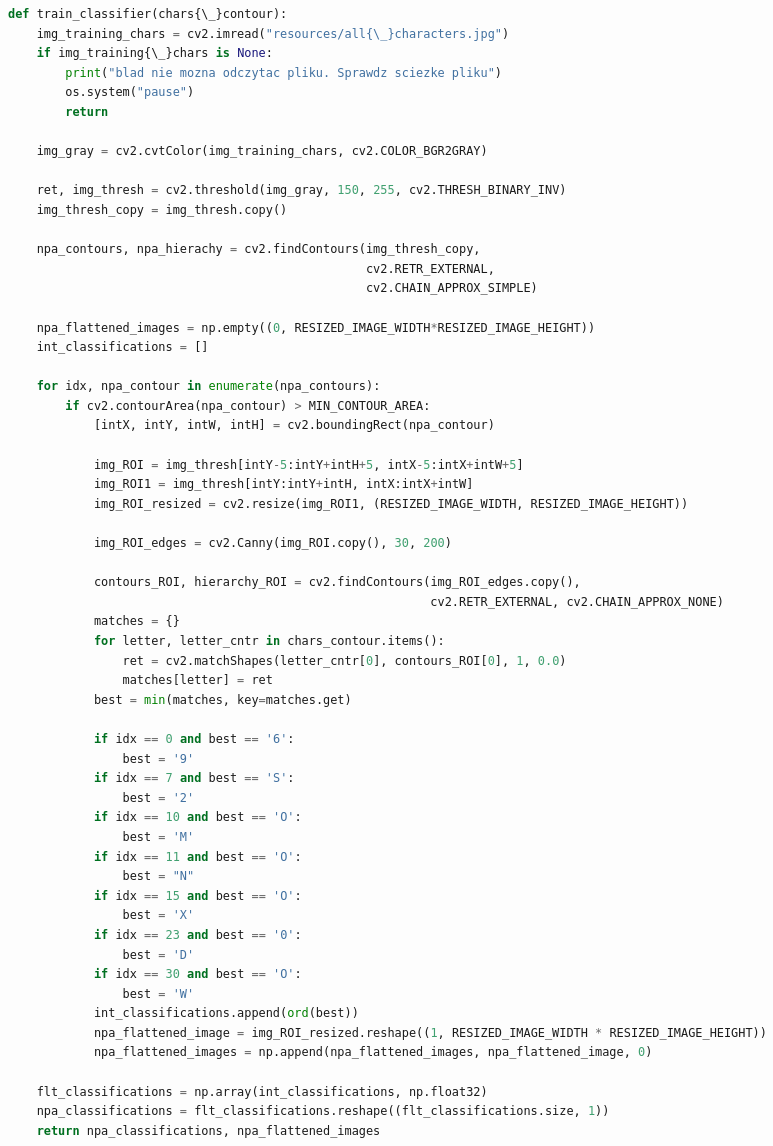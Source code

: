 \documentclass[12pt,a4paper,oneside]{article}
\theoremstyle{definition}
\numberwithin{equation}{section}
\begin{document}
\begin{adjustbox}{max width=\textwidth}
\begin{lstlisting}[language=Python]
def train_classifier(chars{\_}contour):
    img_training_chars = cv2.imread("resources/all{\_}characters.jpg")
    if img_training{\_}chars is None:
        print("blad nie mozna odczytac pliku. Sprawdz sciezke pliku")
        os.system("pause")
        return

    img_gray = cv2.cvtColor(img_training_chars, cv2.COLOR_BGR2GRAY)

    ret, img_thresh = cv2.threshold(img_gray, 150, 255, cv2.THRESH_BINARY_INV)
    img_thresh_copy = img_thresh.copy()

    npa_contours, npa_hierachy = cv2.findContours(img_thresh_copy,
                                                  cv2.RETR_EXTERNAL,
                                                  cv2.CHAIN_APPROX_SIMPLE)

    npa_flattened_images = np.empty((0, RESIZED_IMAGE_WIDTH*RESIZED_IMAGE_HEIGHT))
    int_classifications = []

    for idx, npa_contour in enumerate(npa_contours):
        if cv2.contourArea(npa_contour) > MIN_CONTOUR_AREA:
            [intX, intY, intW, intH] = cv2.boundingRect(npa_contour)

            img_ROI = img_thresh[intY-5:intY+intH+5, intX-5:intX+intW+5]
            img_ROI1 = img_thresh[intY:intY+intH, intX:intX+intW]
            img_ROI_resized = cv2.resize(img_ROI1, (RESIZED_IMAGE_WIDTH, RESIZED_IMAGE_HEIGHT))

            img_ROI_edges = cv2.Canny(img_ROI.copy(), 30, 200)

            contours_ROI, hierarchy_ROI = cv2.findContours(img_ROI_edges.copy(),
                                                           cv2.RETR_EXTERNAL, cv2.CHAIN_APPROX_NONE)
            matches = {}
            for letter, letter_cntr in chars_contour.items():
                ret = cv2.matchShapes(letter_cntr[0], contours_ROI[0], 1, 0.0)
                matches[letter] = ret
            best = min(matches, key=matches.get)
            
            if idx == 0 and best == '6':
                best = '9'
            if idx == 7 and best == 'S':
                best = '2'
            if idx == 10 and best == 'O':
                best = 'M'
            if idx == 11 and best == 'O':
                best = "N"
            if idx == 15 and best == 'O':
                best = 'X'
            if idx == 23 and best == '0':
                best = 'D'
            if idx == 30 and best == 'O':
                best = 'W'
            int_classifications.append(ord(best))
            npa_flattened_image = img_ROI_resized.reshape((1, RESIZED_IMAGE_WIDTH * RESIZED_IMAGE_HEIGHT))
            npa_flattened_images = np.append(npa_flattened_images, npa_flattened_image, 0)

    flt_classifications = np.array(int_classifications, np.float32)
    npa_classifications = flt_classifications.reshape((flt_classifications.size, 1))
    return npa_classifications, npa_flattened_images
\end{lstlisting} 
\end{adjustbox}
\end{document}
